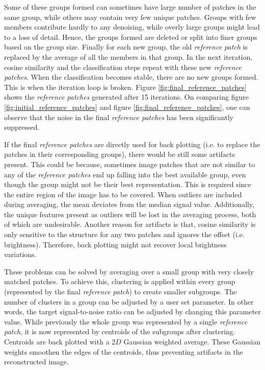 \documentclass[fleqn,10pt]{wlscirep}
\begin{document}
	Some of these groups formed can sometimes have large number of patches in the same group, while others may contain very few unique patches. Groups with few members contribute hardly to any denoising, while overly large groups might lead to a loss of detail. Hence, the groups formed are deleted or split into finer groups based on the group size. Finally for each new group, the old \textit{reference patch} is replaced by the average of all the members in that group. In the next iteration, cosine similarity and the classification steps repeat with these new \textit{reference patches}. When the classification becomes stable, there are no new groups formed. This is when the iteration loop is broken. Figure \ref{fig:final_reference_patches} shows the \textit{reference patches} generated after 15 iterations. On comparing figure \ref{fig:initial_reference_patches} and figure \ref{fig:final_reference_patches}, one can observe that the noise in the final \textit{reference patches} has been significantly suppressed.


	
	If the final \textit{reference patches} are directly used for back plotting (i.e. to replace the patches in their corresponding groups), there would be still some artifacts present. This could be because, sometimes image patches that are not similar to any of the \textit{reference patches} end up falling into the best available group, even though the group might not be their best representation. This is required since the entire region of the image has to be covered. When outliers are included during averaging, the mean deviates from the median signal value. Additionally, the unique features present as outliers will be lost in the averaging process, both of which are undesirable. Another reason for artifacts is that, cosine similarity is only sensitive to the structure for any two patches and ignores the offset (i.e. brightness). Therefore, back plotting might not recover local brightness variations.
	
	These problems can be solved by averaging over a small group with very closely matched patches. To achieve this, clustering is applied within every group (represented by the final \textit{reference patch}) to create smaller subgroups. The number of clusters in a group can be adjusted by a user set parameter. In other words, the target signal-to-noise ratio can be adjusted by changing this parameter value. While previously the whole group was represented by a single \textit{reference patch}, it is now represented by centroids of the subgroups after clustering. Centroids are back plotted with a $2D$ Gaussian weighted average. These Gaussian weights smoothen the edges of the centroids, thus preventing artifacts in the reconstructed image. 
	
\end{document}

